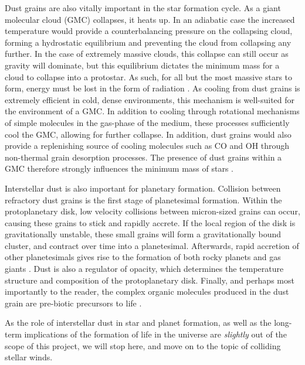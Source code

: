 Dust grains are also vitally important in the star formation cycle.
As a giant molecular cloud (GMC) collapses, it heats up.
In an adiabatic case the increased temperature would provide a counterbalancing pressure on the collapsing cloud, forming a hydrostatic equilibrium and preventing the cloud from collapsing any further.
In the case of extremely massive clouds, this collapse can still occur as gravity will dominate, but this equilibrium dictates the minimum mass for a cloud to collapse into a protostar.
As such, for all but the most massive stars to form, energy must be lost in the form of radiation
.
As cooling from dust grains is extremely efficient in cold, dense environments, this mechanism is well-suited for the environment of a GMC.
In addition to cooling through rotational mechanisms of simple molecules in the gas-phase of the medium, these processes sufficiently cool the GMC, allowing for further collapse.
In addition, dust grains would also provide a replenishing source of cooling molecules such as CO and OH through non-thermal grain desorption processes.
The presence of dust grains within a GMC therefore strongly influences the minimum mass of stars
.

Interstellar dust is also important for planetary formation.
Collision between refractory dust grains is the first stage of planetesimal formation.
Within the protoplanetary disk, low velocity collisions between micron-sized grains can occur, causing these grains to stick and rapidly accrete.
If the local region of the disk is gravitationally unstable, these small grains will form a gravitationally bound cluster, and contract over time into a planetesimal.
Afterwards, rapid accretion of other planetesimals gives rise to the formation of both rocky planets and gas giants
.
Dust is also a regulator of opacity, which determines the temperature structure and composition of the protoplanetary disk.
Finally, and perhaps most importantly to the reader, the complex organic molecules produced in the dust grain are pre-biotic precursors to life
\parencite{birnstielDustEvolutionFormation2016}.

As the role of interstellar dust in star and planet formation, as well as the long-term implications of the formation of life in the universe are \textit{slightly} out of the scope of this project, we will stop here, and move on to the topic of colliding stellar winds.

